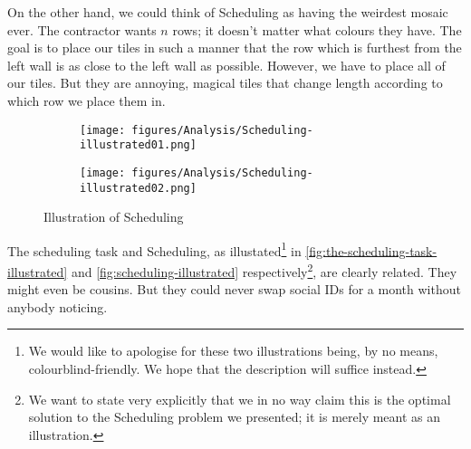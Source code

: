 On the other hand, we could think of Scheduling as having the weirdest mosaic ever. The contractor wants \(n\) rows; it doesn't matter what colours they have. The goal is to place our tiles in such a manner that the row which is furthest from the left wall is as close to the left wall as possible. However, we have to place all of our tiles. But they are annoying, magical tiles that change length according to which row we place them in.
\begin{figure}[H]
    \centering
    \begin{subfigure}[t]{0.715\textwidth}
        \centering
        \texttt{[image: figures/Analysis/Scheduling-illustrated01.png]}
    \end{subfigure}
    \hfill
    \begin{subfigure}[t]{0.25\textwidth}
        \centering
        \texttt{[image: figures/Analysis/Scheduling-illustrated02.png]}
    \end{subfigure}
    \caption{Illustration of Scheduling}
    \label{fig:scheduling-illustrated}
\end{figure}
The scheduling task and Scheduling, as illustated\footnote{We would like to apologise for these two illustrations being, by no means, colourblind-friendly. We hope that the description will suffice instead.} in \autoref{fig:the-scheduling-task-illustrated} and \autoref{fig:scheduling-illustrated} respectively\footnote{We want to state very explicitly that we in no way claim this is the optimal solution to the Scheduling problem we presented; it is merely meant as an illustration.}, are clearly related. They might even be cousins. But they could never swap social IDs for a month without anybody noticing.

